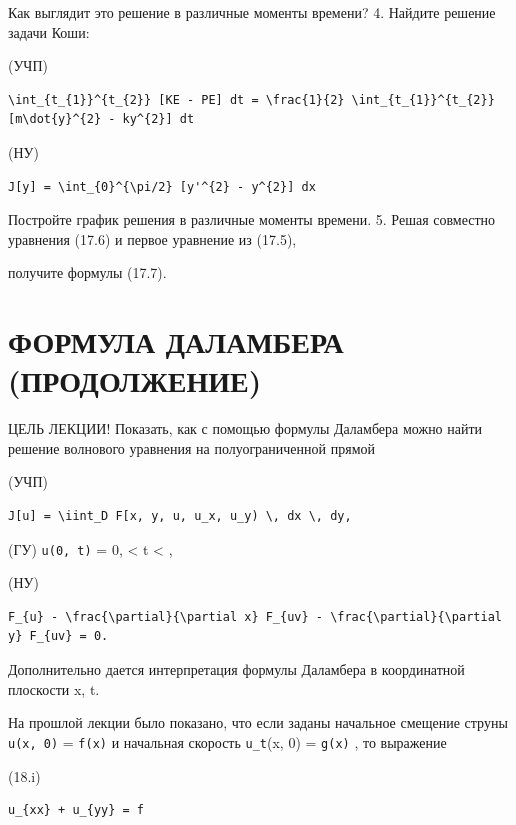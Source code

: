 \documentclass[
  ukrainian,
]{article}
\begin{document}
Как выглядит это решение в различные моменты времени? 4. Найдите решение
задачи Коши:

(УЧП)

\begin{verbatim}
\int_{t_{1}}^{t_{2}} [KE - PE] dt = \frac{1}{2} \int_{t_{1}}^{t_{2}} [m\dot{y}^{2} - ky^{2}] dt
\end{verbatim}

(НУ)

\begin{verbatim}
J[y] = \int_{0}^{\pi/2} [y'^{2} - y^{2}] dx
\end{verbatim}

Постройте график решения в различные моменты времени. 5. Решая совместно
уравнения (17.6) и первое уравнение из (17.5),

получите формулы (17.7).

\section{ФОРМУЛА ДАЛАМБЕРА
(ПРОДОЛЖЕНИЕ)}\label{ux444ux43eux440ux43cux443ux43bux430-ux434ux430ux43bux430ux43cux431ux435ux440ux430-ux43fux440ux43eux434ux43eux43bux436ux435ux43dux438ux435}

ЦЕЛЬ ЛЕКЦИИ! Показать, как с помощью формулы Даламбера можно найти
решение волнового уравнения на полуограниченной прямой

(УЧП)

\begin{verbatim}
J[u] = \iint_D F[x, y, u, u_x, u_y) \, dx \, dy,
\end{verbatim}

(ГУ) \texttt{u(0,\ t)} = 0,  \textless{} t \textless{} \infty,

(НУ)

\begin{verbatim}
F_{u} - \frac{\partial}{\partial x} F_{uv} - \frac{\partial}{\partial y} F_{uv} = 0.
\end{verbatim}

Дополнительно дается интерпретация формулы Даламбера в координатной
плоскости x, t.

На прошлой лекции было показано, что если заданы начальное смещение
струны \texttt{u(x,\ 0)} = \texttt{f(x)} и начальная скорость
\texttt{u\_t}(x, 0) = \texttt{g(x)} , то выражение

(18.i)

\begin{verbatim}
u_{xx} + u_{yy} = f
\end{verbatim}
\end{document}
